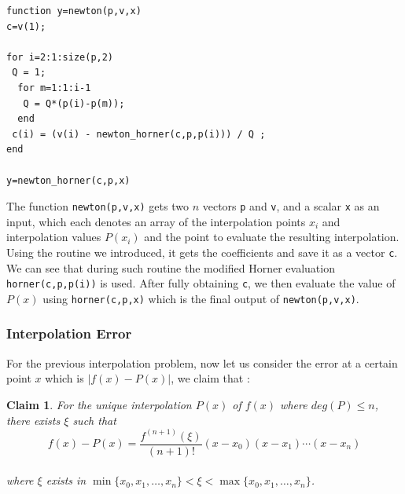 \documentclass[paper=a4, fontsize=11pt]{scrartcl}
\newtheorem{claim}{Claim}
\begin{document}
\begin{lstlisting}[caption = 'newton.m']
function y=newton(p,v,x)
c=v(1);

for i=2:1:size(p,2)
 Q = 1;
  for m=1:1:i-1
   Q = Q*(p(i)-p(m));
  end
 c(i) = (v(i) - newton_horner(c,p,p(i))) / Q ;
end

y=newton_horner(c,p,x)
\end{lstlisting}
\vspace{0.15in}

The function \texttt{newton(p,v,x)} gets two $n$ vectors \texttt{p} and \texttt{v}, and a scalar \texttt{x} as an input, which each denotes an array of the interpolation points $x_i$ and interpolation values $P(x_i)$ and the point to evaluate the resulting interpolation. Using the routine we introduced, it gets the coefficients and save it as a vector \texttt{c}. We can see that during such routine the modified Horner evaluation \texttt{horner(c,p,p(i))} is used. After fully obtaining \texttt{c}, we then evaluate the value of $P(x)$ using \texttt{horner(c,p,x)} which is the final output of \texttt{newton(p,v,x)}. 

\vspace{0.15in}
\subsubsection{Interpolation Error}
\vspace{0.15in}

For the previous interpolation problem, now let us consider the error at a certain point $x$ which is $|f(x)-P(x)|$, we claim that : \\

\begin{claim}
For the unique interpolation $P(x)$ of $f(x)$ where $deg(P) \leq n$, there exists $\xi$ such that\\

\begin{equation}\nonumber
	f(x)-P(x) = \frac{f^{(n+1)}(\xi)}{(n+1)!} (x-x_0)(x-x_1) \cdots (x-x_n)
\end{equation}\\

where $\xi$ exists in $\min\{x_0, x_1, \dots , x_n\} < \xi < \max\{ x_0, x_1, \dots , x_n \}$.
\end{claim}
\end{document}
